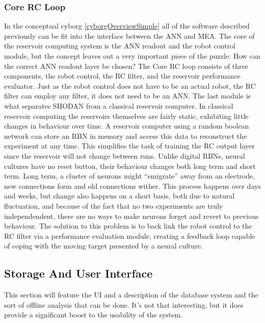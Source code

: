 \subsubsection{Core RC Loop}
In the conceptual cyborg \ref{cyborgOverviewSimple} all of the software
described previously can be fit into the interface between the ANN and MEA.
The core of the reservoir computing system is the ANN readout and the robot
control module, but the concept leaves out a very important piece of the puzzle:
How can the correct ANN readout layer be chosen?
The Core RC loop consists of three components, the robot control, the RC
filter, and the reservoir performance evaluator.
Just as the robot control does not have to be an actual robot, the RC filter
can employ any filter, it does not need to be an ANN.
The last module is what separates SHODAN from a classical reservoir computer.
In classical reservoir computing the reservoirs themselves are fairly static,
exhibiting little changes in behaviour over time.
A reservoir computer using a random boolean network can store an RBN in memory
and access this data to reconstruct the experiment at any time.
This simplifies the task of training the RC output layer since the reservoir
will not change between runs.
Unlike digital RBNs, neural cultures have no reset button, their behaviour
changes both long term and short term.
Long term, a cluster of neurons might ``emigrate'' away from an electrode, new
connections form and old connections wither.
This process happens over days and weeks, but change also happens on a short
basis, both due to natural fluctuation, and because of the fact that no two
experiments are truly independendent, there are no ways to make neurons forget
and revert to previous behaviour.
The solution to this problem is to back link the robot control to the RC filter
via a performance evaluation module, creating a feedback loop capable of coping
with the moving target presented by a neural culture.\par
\subsection{Storage And User Interface}
This section will feature the UI and a description of the database system and
the sort of offline analysis that can be done.
It's not that interesting, but it does provide a significant boost to the
usability of the system.
%
